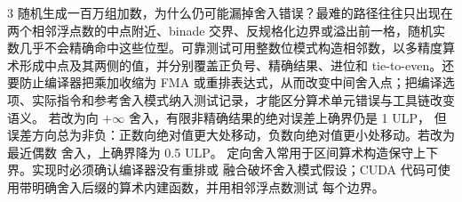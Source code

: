 \begin{solutionexercise}{3}
随机生成一百万组加数，为什么仍可能漏掉舍入错误？最难的路径往往只出现在两个相邻浮点数的中点附近、binade 交界、反规格化边界或溢出前一格，随机实数几乎不会精确命中这些位型。可靠测试可用整数位模式构造相邻数，以多精度算术形成中点及其两侧的值，并分别覆盖正负号、精确结果、进位和 tie-to-even。还要防止编译器把乘加收缩为 FMA 或重排表达式，从而改变中间舍入点；把编译选项、实际指令和参考舍入模式纳入测试记录，才能区分算术单元错误与工具链改变语义。
\variantheading 若改为向 $+\infty$ 舍入，有限非精确结果的绝对误差上确界仍是 1 ULP，
但误差方向总为非负：正数向绝对值更大处移动，负数向绝对值更小处移动。若改为最近偶数
舍入，上确界降为 0.5 ULP。
\practiceheading 定向舍入常用于区间算术构造保守上下界。实现时必须确认编译器没有重排或
融合破坏舍入模式假设；CUDA 代码可使用带明确舍入后缀的算术内建函数，并用相邻浮点数测试
每个边界。
\end{solutionexercise}

